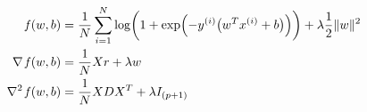 




\begin{align*}
\operatorname*{\mathit{f}}(w,b) &=
\frac{1}{N}\sum_{i=1}^N\log\biggl(1+\exp\Bigl(-y^{(i)}\bigl(w^Tx^{(i)}+b\bigr)\Bigr)\biggr)+
\lambda\frac{1}{2}\lVert w\rVert^2 \\
\nabla\operatorname*{\mathit{f}}(w,b) &= \frac{1}{N}Xr+\lambda w \\
\nabla^2\operatorname*{\mathit{f}}(w,b) &= \frac{1}{N}XDX^T+\lambda I_{(p+1)}
\end{align*}



